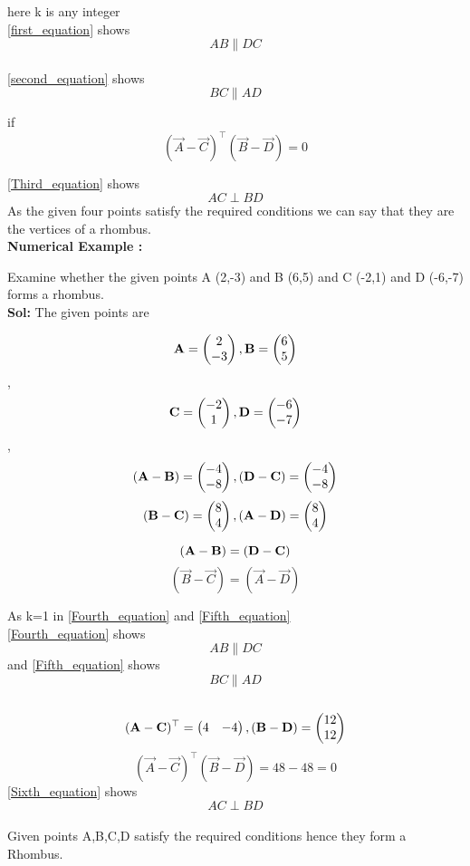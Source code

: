 \documentclass{article}
\begin{document}
here k is any integer\\
\ref{first_equation} shows 
$$AB \parallel DC $$\\
\ref{second_equation} shows 
$$BC \parallel AD$$

if 
\begin{equation}\label{Third_equation}
(\vec{A}-\vec{C} )^ \top ( \vec{B}-\vec{D} ) = 0 
\end{equation}

\ref{Third_equation} shows
$$AC \perp BD $$
{As the given four points satisfy the required conditions we can say that they are the vertices of a rhombus.}\\
\textbf{Numerical Example :}
 
{Examine whether the given points A (2,-3) and B (6,5) and C (-2,1) and D (-6,-7) forms a rhombus.}\\

 \textbf{Sol:}
 The given points are

$$\vec{A} = \myvec{2\\-3}, \vec{B} =\myvec{6\\5}$$,
$$\vec{C} =\myvec{-2\\1}, \vec{D} =\myvec{-6\\-7}$$,
$$(\vec{A}-\vec{B} ) = \myvec{-4\\-8}, (\vec{D}-\vec{C} ) = \myvec{-4\\-8}$$
$$(\vec{B}-\vec{C} ) = \myvec{8\\4}, (\vec{A}-\vec{D} ) = \myvec{8\\4}$$

\begin{equation}\label{Fourth_equation}
(\vec{A}-\vec{B} ) = (\vec{D}-\vec{C} )  \\
\end{equation}
\begin{equation}\label{Fifth_equation}
(\vec{B}-\vec{C} )  = (\vec{A}-\vec{D} ) 
\end{equation}

 {As k=1 in \ref{Fourth_equation} and \ref{Fifth_equation}}\\
 {}
\ref{Fourth_equation} shows $$ AB  {\parallel} DC $$ and \ref{Fifth_equation} shows $$BC \parallel AD $$\\
$$(\vec{A}-\vec{C} )^\top = \myvec{4&-4 }
,(\vec{B}-\vec{D} ) = \myvec{12\\12}$$
\begin{equation}\label{Sixth_equation}
(\vec{A}-\vec{C} )^ \top ( \vec{B}-\vec{D} ) = 48-48 = 0
\end{equation}
 \ref{Sixth_equation} shows
$$AC \perp BD $$\\ 
{Given points A,B,C,D satisfy the required 
conditions hence they form a Rhombus.}
\end{document}

